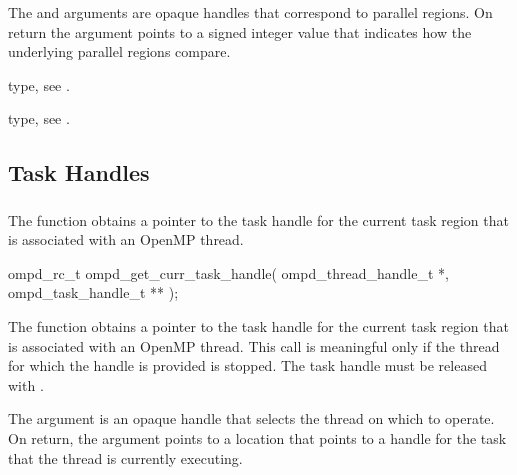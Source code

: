 \argdesc
The  and  arguments are 
opaque handles that correspond to parallel regions. On return the 
argument points to a signed integer value that indicates how the underlying 
parallel regions compare.

\begin{crossrefs}
\item {} type, 
see .

\item {} type, see .
\end{crossrefs}



\subsection{Task Handles}



\subsubsection{}
\label{subsubsubsec:ompd_get_curr_task_handle}

\summary
The  function obtains a pointer to the task 
handle for the current task region that is associated with an OpenMP thread.

\format
\begin{cspecific}
\begin{ompSyntax}
ompd_rc_t ompd_get_curr_task_handle(
  ompd_thread_handle_t *,
  ompd_task_handle_t **
);
\end{ompSyntax}
\end{cspecific}

\descr
The  function obtains a pointer to the task 
handle for the current task region that is associated with an OpenMP thread.
This call is meaningful only if the thread for which the handle is provided 
is stopped. The task handle must be released with .

\argdesc
The  argument is an opaque handle that selects the thread 
on which to operate. On return, the  argument points to a 
location that points to a handle for the task that the thread is currently 
executing.

